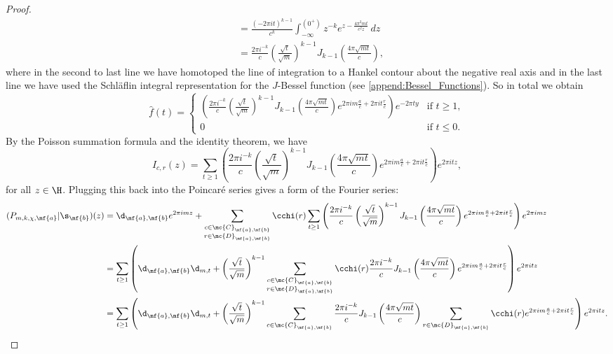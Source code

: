 \begin{proof}
\begin{align*}
        &= \frac{(-2\pi it)^{k-1}}{c^{k}}\int_{-\infty}^{(0^{+})}z^{-k}e^{z-\frac{4\pi^{2}mt}{c^{2}z}}\,dz \\
        &= \frac{2\pi i^{-k}}{c}\left(\frac{\sqrt{t}}{\sqrt{m}}\right)^{k-1}J_{k-1}\left(\frac{4\pi\sqrt{mt}}{c}\right),
      \end{align*}
      where in the second to last line we have homotoped the line of integration to a Hankel contour about the negative real axis and in the last line we have used the Schl\"aflin integral representation for the $J$-Bessel function (see \cref{append:Bessel_Functions}). So in total we obtain
      \[
        \hat{f}(t) = \begin{cases} \left(\frac{2\pi i^{-k}}{c}\left(\frac{\sqrt{t}}{\sqrt{m}}\right)^{k-1}J_{k-1}\left(\frac{4\pi\sqrt{mt}}{c}\right)e^{2\pi im\frac{a}{c}+2\pi it\frac{r}{c}}\right)e^{-2\pi ty} & \text{if $t \ge 1$}, \\ 0 & \text{if $t \le 0$}. \end{cases}
      \]
      By the Poisson summation formula and the identity theorem, we have
      \[
        I_{c,r}(z) = \sum_{t \ge 1}\left(\frac{2\pi i^{-k}}{c}\left(\frac{\sqrt{t}}{\sqrt{m}}\right)^{k-1}J_{k-1}\left(\frac{4\pi\sqrt{mt}}{c}\right)e^{2\pi im\frac{a}{c}+2\pi it\frac{r}{c}}\right)e^{2\pi itz},
      \]
      for all $z \in \H$. Plugging this back into the Poincar\'e series gives a form of the Fourier series:
      \begin{align*}
        (P_{m,k,\chi,\mf{a}}|\s_{\mf{b}})(z) &= \d_{\mf{a},\mf{b}}e^{2\pi imz}+\sum_{\substack{c \in \mc{C}_{\mf{a},\mf{b}} \\ r \in \mc{D}_{\mf{a},\mf{b}}}}\cchi(r)\sum_{t \ge 1}\left(\frac{2\pi i^{-k}}{c}\left(\frac{\sqrt{t}}{\sqrt{m}}\right)^{k-1}J_{k-1}\left(\frac{4\pi\sqrt{mt}}{c}\right)e^{2\pi im\frac{a}{c}+2\pi it\frac{r}{c}}\right)e^{2\pi imz} \\
        &= \sum_{t \ge 1}\left(\d_{\mf{a},\mf{b}}\d_{m,t}+\left(\frac{\sqrt{t}}{\sqrt{m}}\right)^{k-1}\sum_{\substack{c \in \mc{C}_{\mf{a},\mf{b}} \\ r \in \mc{D}_{\mf{a},\mf{b}}}}\cchi(r)\frac{2\pi i^{-k}}{c}J_{k-1}\left(\frac{4\pi\sqrt{mt}}{c}\right)e^{2\pi im\frac{a}{c}+2\pi it\frac{r}{c}}\right)e^{2\pi itz} \\
        &= \sum_{t \ge 1}\left(\d_{\mf{a},\mf{b}}\d_{m,t}+\left(\frac{\sqrt{t}}{\sqrt{m}}\right)^{k-1}\sum_{\substack{c \in \mc{C}_{\mf{a},\mf{b}}}}\frac{2\pi i^{-k}}{c}J_{k-1}\left(\frac{4\pi\sqrt{mt}}{c}\right)\sum_{r \in \mc{D}_{\mf{a},\mf{b}}}\cchi(r)e^{2\pi im\frac{a}{c}+2\pi it\frac{r}{c}}\right)e^{2\pi itz}.

\end{align*}
\end{proof}
